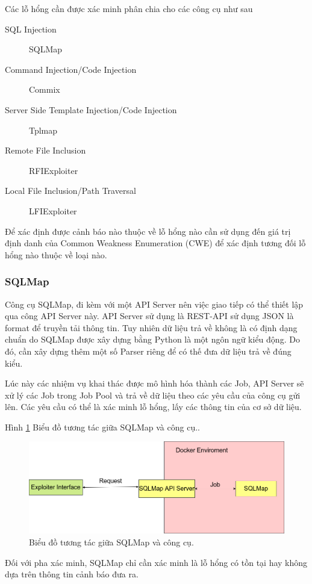 \documentclass[./../main.tex]{subfiles}
\begin{document}
Các lỗ hổng cần được xác minh phân chia cho các công cụ như sau
\begin{description}
	\item[SQL Injection] SQLMap
	\item [Command Injection/Code Injection] Commix
	\item [Server Side Template Injection/Code Injection] Tplmap
	\item [Remote File Inclusion] RFIExploiter
	\item [Local File Inclusion/Path Traversal] LFIExploiter
\end{description}
Để xác định được cảnh báo nào thuộc về lỗ hổng nào cần sử dụng đến giá trị định danh của Common Weakness Enumeration (CWE) để xác định tương đối lỗ hổng nào thuộc về loại nào.
\subsubsection{SQLMap}
Công cụ SQLMap, đi kèm với một API Server nên việc giao tiếp có thể thiết lập qua công API Server này. API Server sử dụng là REST-API sử dụng JSON là format để truyền tải thông tin. Tuy nhiên dữ liệu trả về không là có định dạng chuẩn do SQLMap được xây dựng bằng Python là một ngôn ngữ kiểu động. Do đó, cần xây dựng thêm một số Parser riêng để có thế đưa dữ liệu trả về đúng kiểu.

Lúc này các nhiệm vụ khai thác được mô hình hóa thành các Job, API Server sẽ xử lý các Job trong Job Pool và trả về dữ liệu theo các yêu cầu của công cụ gửi lên. Các yêu cầu có thể là xác minh lỗ hổng, lấy các thông tin của cơ sở dữ liệu.

Hình \ref{fig:sqlmap} Biểu đồ tương tác giữa SQLMap và công cụ..

\begin{figure}[h!]
	\includegraphics[width=\linewidth]{./images/SQLMap.drawio.png}
	\caption{Biểu đồ tương tác giữa SQLMap và công cụ.}
	\label{fig:sqlmap}
\end{figure}

Đối với pha xác minh, SQLMap chỉ cần xác minh là lỗ hổng có tồn tại hay không dựa trên thông tin cảnh báo đưa ra.
\end{document}
